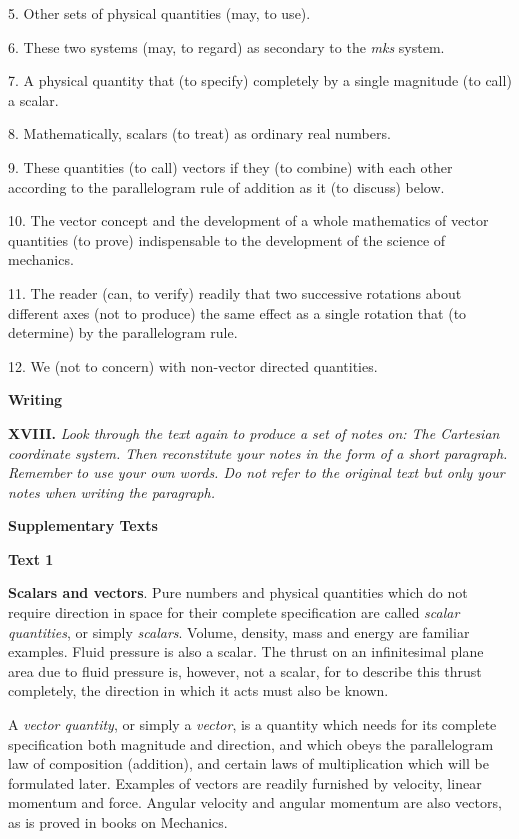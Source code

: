 \documentclass[a4paper]{article}
\newcommand{\ESect}[1]{\medskip\par{\large \textbf{#1}}\par}
\newcommand{\ETask}[2]{\medskip\par\textbf{#1.} \textit{#2}\par}
\begin{document}
5. Other sets of physical quantities (may, to use).

6. These two systems (may, to regard) as secondary to the \textit{mks} system.

7. A physical quantity that (to specify) completely by a single magnitude (to call) a scalar.

8. Mathematically, scalars (to treat) as ordinary real numbers.

9. These quantities (to call) vectors if they (to combine) with each other according to the parallelogram rule of addition as
it (to discuss) below.

10. The vector concept and the development of a whole mathematics of vector quantities (to prove) indispensable to the development
of the science of mechanics.

11. The reader (can, to verify) readily that two successive rotations about different axes (not to produce) the same effect as a
single rotation that (to determine) by the parallelogram rule.

12. We (not to concern) with non-vector directed quantities.

\ESect{Writing}

\ETask{XVIII}{Look through the text again to produce a set of notes on: The Cartesian coordinate system. Then reconstitute
your notes in the form of a short paragraph. Remember to use your own words. Do not refer to the original text but only your
notes when writing the paragraph.}

\ESect{Supplementary Texts}

\ESect{Text 1}
\textbf{Scalars and vectors}. Pure numbers and physical quantities which do not require direction in space for their complete
specification are called \textit{scalar quantities}, or simply \textit{scalars}. Volume, density, mass and energy are familiar examples. Fluid
pressure is also a scalar. The thrust on an infinitesimal plane area due to fluid pressure is, however, not a scalar, for to
describe this thrust completely, the direction in which it acts must also be known.

A \textit{vector quantity}, or simply a \textit{vector}, is a quantity which needs for its complete specification both magnitude
and direction, and which obeys the parallelogram law of composition (addition), and certain laws of multiplication which will be
formulated later. Examples of vectors are readily furnished by velocity, linear momentum and force. Angular velocity and angular
momentum are also vectors, as is proved in books on Mechanics.
\end{document}
